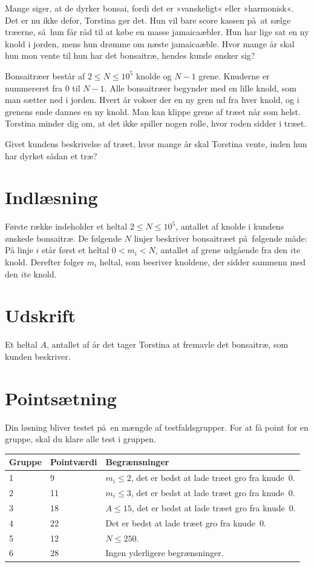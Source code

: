 
Mange siger, at de dyrker bonsai, fordi det er »vanskeligt« eller »harmonisk«.
Det er nu ikke defor, Torstina gør det.
Hun vil bare score kassen på at sælge træerne, så hun får råd til at købe en masse jamaicaæbler.
Hun har lige sat en ny knold i jorden, mens hun drømme om næste jamaicaæble.
Hvor mange år skal hun mon vente til hun har det bonsaitræ, hendes kunde ønsker sig?

Bonsaitræer består af $2\leq N \leq 10^5$ knolde og $N-1$ grene.
Knuderne er nummereret fra $0$ til $N-1$. 
Alle bonsaitræer begynder med en lille knold, som man sætter ned i jorden.
Hvert år vokser der en ny gren ud fra hver knold, og i grenens ende dannes en ny knold.
Man kan klippe grene af træet når som helst. 
Torstina minder dig om, at det ikke spiller nogen rolle, hvor roden sidder i træet.

Givet kundens beskrivelse af træet, hvor mange år skal Torstina vente, inden hun har dyrket sådan et træ?

\section*{Indlæsning}

Første række indeholder et heltal $2\leq N\leq 10^5$, antallet af knolde i kundens ønskede bonsaitræ.
De følgende $N$ linjer beskriver bonsaitræet på følgende måde:
På linje $i$ står først et heltal $0 < m_i < N$, antallet af grene udgående fra den $i$te knold. 
Derefter folger $m_i$ heltal, som besriver knoldene, der sidder sammenn med den $i$te knold.

\section*{Udskrift}
Et heltal $A$, antallet af år det tager Torstina at fremavle det bonsaitræ, som kunden beskriver.

\section*{Pointsætning}

Din løsning bliver testet på en mængde af testfaldsgrupper.
For at få point for en gruppe, skal du klare alle test i gruppen. 

\noindent
\begin{tabular}{| l | l | l |}
\hline
Gruppe & Pointværdi & Begrænsninger \\ \hline
1      &  9         & $m_i\leq 2$, det er bedst at lade træet gro fra knude~0.\\ \hline
2      & 11         & $m_i \leq 3$, det er bedst at lade træet gro fra knude~0. \\ \hline
3      & 18         & $A \leq 15$, det er bedst at lade træet gro fra knude~0. \\ \hline
4      & 22         & Det er bedst at lade træet gro fra knude~0. \\ \hline
5      & 12         & $N \leq 250$. \\ \hline
6      & 28         & Ingen yderligere begrænsninger. \\ \hline
\end{tabular}

